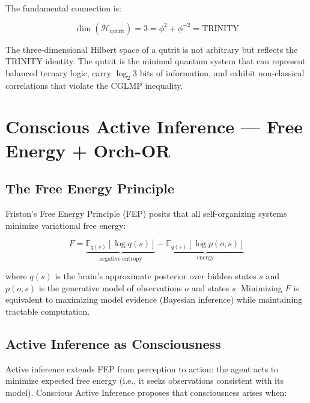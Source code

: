 \documentclass[12pt,a4paper]{article}
\begin{document}
The fundamental connection is:

\begin{equation}
\dim(\mathcal{H}_{\mathrm{qutrit}}) = 3 = \phi^2 + \phi^{-2} = \text{TRINITY}
\end{equation}

\noindent
The three-dimensional Hilbert space of a qutrit is not arbitrary but reflects
the TRINITY identity. The qutrit is the minimal quantum system that can
represent balanced ternary logic, carry $\log_2 3$ bits of information, and
exhibit non-classical correlations that violate the CGLMP inequality.

\section{Conscious Active Inference --- Free Energy + Orch-OR}
\label{sec:active_inference}

\subsection{The Free Energy Principle}

Friston's Free Energy Principle (FEP) \cite{Friston2010} posits that all
self-organizing systems minimize variational free energy:

\begin{equation}
F = \underbrace{\mathbb{E}_{q(s)}[\log q(s)]}_{\text{negative entropy}}
  - \underbrace{\mathbb{E}_{q(s)}[\log p(o, s)]}_{\text{energy}}
\label{eq:fep}
\end{equation}

\noindent
where $q(s)$ is the brain's approximate posterior over hidden states $s$ and
$p(o, s)$ is the generative model of observations $o$ and states $s$.
Minimizing $F$ is equivalent to maximizing model evidence (Bayesian inference)
while maintaining tractable computation.

\subsection{Active Inference as Consciousness}

Active inference extends FEP from perception to action: the agent acts to
minimize expected free energy (i.e., it seeks observations consistent with its
model). Conscious Active Inference \cite{CAI2025} proposes that consciousness
arises when:
\end{document}
